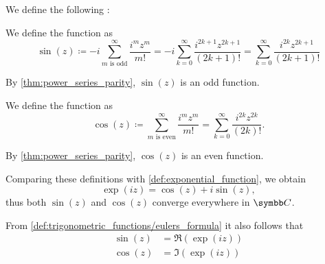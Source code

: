 \begin{definition}\label{def:trigonometric_functions}
  We define the following :

  \begin{defenum}
     We define the  function as
    \begin{equation*}
      \sin(z)
      \coloneqq
      -i \sum_{m \text{ is odd}}^\infty \frac {i^m z^m} {m!}
      =
      -i \sum_{k=0}^\infty \frac {i^{2k+1} z^{2k+1}} {(2k + 1)!}
      =
      \sum_{k=0}^\infty \frac {i^{2k} z^{2k+1}} {(2k + 1)!}
    \end{equation*}

    By \cref{thm:power_series_parity}, \( \sin(z) \) is an odd function.

     We define the  function as
    \begin{equation*}
      \cos(z)
      \coloneqq
      \sum_{m \text{ is even}}^\infty \frac {i^m z^m} {m!}
      =
      \sum_{k=0}^\infty \frac {i^{2k} z^{2k}} {(2k)!}.
    \end{equation*}

    By \cref{thm:power_series_parity}, \( \cos(z) \) is an even function.
  \end{defenum}

  Comparing these definitions with \cref{def:exponential_function}, we obtain 
  \begin{equation}\label{def:trigonometric_functions/eulers_formula}
    \exp(iz) = \cos(z) + i \sin(z),
  \end{equation}
  thus both \( \sin(z) \) and \( \cos(z) \) converge everywhere in \( \C \).

  From \cref{def:trigonometric_functions/eulers_formula} it also follows that
  \begin{align*}
    \sin(z) &= \Re(\exp(iz)) \\
    \cos(z) &= \Im(\exp(iz))
  \end{align*}
\end{definition}


